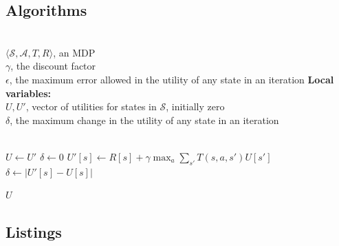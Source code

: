 \documentclass{article}
\begin{document}
\subsection{Algorithms}\label{subsec:algorithms}
\begin{algorithmic}
    \REQUIRE ~\\
             $\langle \mathcal{S}, \mathcal{A}, T, R \rangle$, an MDP\\
             $\gamma$, the discount factor\\
             $\epsilon$, the maximum error allowed in the utility of any state in an iteration
    \STATE \hspace{-1em}\textbf{Local variables:}\\
            $U, U'$, vector of utilities for states in $\mathcal{S}$, initially zero\\
            $\delta$, the maximum change in the utility of any state in an iteration\\
            ~

    \REPEAT
        \STATE $U \leftarrow U'$
        \STATE $\delta \leftarrow 0$
            \STATE $U'[s] \leftarrow R[s] + \gamma \max_a \sum_{s'} T(s,a,s') U[s']$
                \STATE $\delta \leftarrow |U'[s] - U[s]|$
            \ENDIF
        \ENDFOR
    ~

    \RETURN $U$
\end{algorithmic}


\subsection{Listings}\label{subsec:listings}
\end{document}
